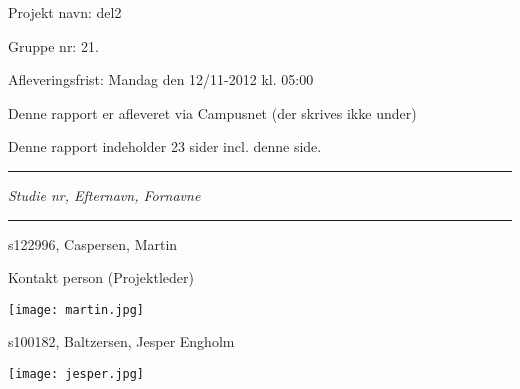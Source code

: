 
{\normalsize

\noindent Projekt navn: del2

\noindent Gruppe nr: 21.

\noindent Afleveringsfrist: Mandag den 12/11-2012 kl. 05:00

\noindent Denne rapport er afleveret via Campusnet (der skrives ikke under)

\noindent Denne rapport indeholder 23 sider incl. denne side.
}
\fancybreak{}
\noindent \emph{Studie nr, Efternavn, Fornavne}
\fancybreak{}

\noindent s122996, Caspersen, Martin

\noindent Kontakt person (Projektleder)

\noindent \texttt{[image: martin.jpg]}

\noindent s100182, Baltzersen, Jesper Engholm

\noindent \texttt{[image: jesper.jpg]}